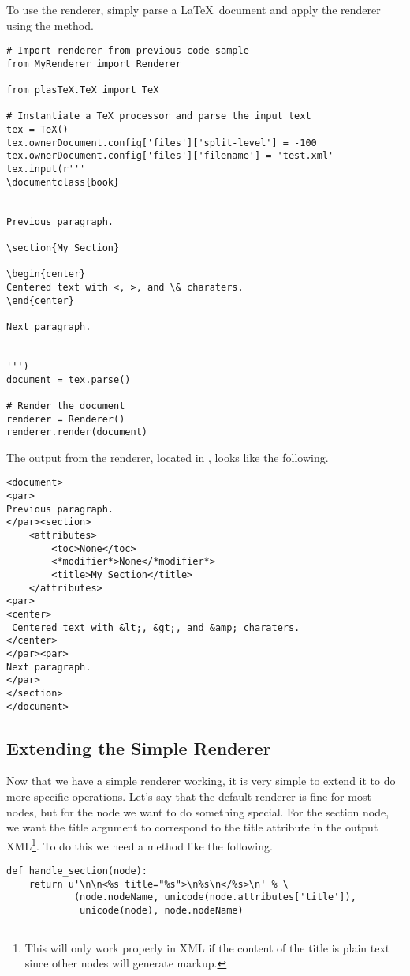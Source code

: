 To use the renderer, simply parse a \LaTeX\ document and apply the renderer
using the  method.
\begin{verbatim}
# Import renderer from previous code sample
from MyRenderer import Renderer

from plasTeX.TeX import TeX

# Instantiate a TeX processor and parse the input text
tex = TeX()
tex.ownerDocument.config['files']['split-level'] = -100
tex.ownerDocument.config['files']['filename'] = 'test.xml'
tex.input(r'''
\documentclass{book}


Previous paragraph.

\section{My Section}

\begin{center}
Centered text with <, >, and \& charaters.
\end{center}

Next paragraph.


''')
document = tex.parse()

# Render the document
renderer = Renderer()
renderer.render(document)
\end{verbatim}

The output from the renderer, located in , looks like the
following.
\begin{verbatim}
<document>
<par>
Previous paragraph.
</par><section>
    <attributes>
        <toc>None</toc>
        <*modifier*>None</*modifier*>
        <title>My Section</title>
    </attributes>
<par>
<center>
 Centered text with &lt;, &gt;, and &amp; charaters.
</center>
</par><par>
Next paragraph.
</par>
</section>
</document>
\end{verbatim}


\subsection{Extending the Simple Renderer}

Now that we have a simple renderer working, it is very simple to extend
it to do more specific operations.  Let's say that the default renderer
is fine for most nodes, but for the  node we want to do
something special.  For the section node, we want the title argument
to correspond to the title attribute in the output XML\footnote{This
will only work properly in XML if the content of the title is plain text
since other nodes will generate markup.}.  To do this we need a
method like the following.
\begin{verbatim}
def handle_section(node):
    return u'\n\n<%s title="%s">\n%s\n</%s>\n' % \
            (node.nodeName, unicode(node.attributes['title']),
             unicode(node), node.nodeName)
\end{verbatim}

